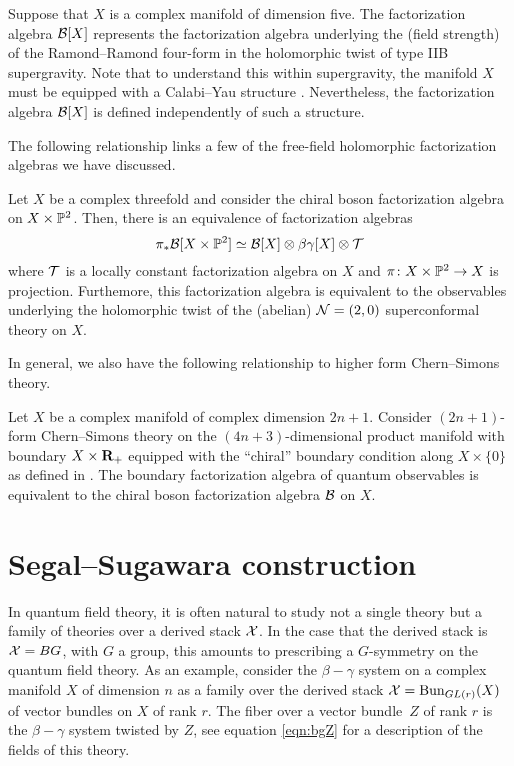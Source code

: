 \documentclass[11pt]{amsart}
\renewcommand{\op}{\operatorname}
\begin{document}
Suppose that $X$ is a complex manifold of dimension five.
The factorization algebra $\mathcal B[X]$ represents the factorization algebra underlying the (field strength) of the Ramond--Ramond four-form in the holomorphic twist of type IIB supergravity.
Note that to understand this within supergravity, the manifold $X$ must be equipped with a Calabi--Yau structure \cite{CLsugra}.
Nevertheless, the factorization algebra $\mathcal B[X]$ is defined independently of such a structure.

The following relationship links a few of the free-field holomorphic factorization algebras we have discussed.

\begin{prop}
  Let $X$ be a complex threefold and consider the chiral boson factorization algebra on $X \times \mathbb P^{2}$.
  Then, there is an equivalence of factorization algebras
  \begin{equation}\label{eqn:20}
    \pi_{*} \mathcal B[X \times \mathbb P^{2}] \simeq \mathcal B[X] \otimes \beta\gamma[X] \otimes \mathcal T
  \end{equation}
  where $\mathcal T$ is a locally constant factorization algebra on $X$ and $\pi \colon X \times \mathbb P^{2}\to X$ is projection.
  Furthemore, this factorization algebra is equivalent to the observables underlying the holomorphic twist of the (abelian) $\mathcal N=(2,0)$ superconformal theory on $X$.
\end{prop}

In general, we also have the following relationship to higher form Chern--Simons theory.

\begin{prop}
Let $X$ be a complex manifold of complex dimension $2n+1$. Consider $(2n+1)$-form Chern--Simons theory on the $(4n+3)$-dimensional product manifold with boundary $X \times \mathbf{R}_+$ equipped with the ``chiral'' boundary condition along $X \times \{0\}$ as defined in \cite{GRWcs}.
The boundary factorization algebra of quantum observables is equivalent to the chiral boson factorization algebra $\mathcal B$ on $X$.
\end{prop}

\section{Segal--Sugawara construction}

In quantum field theory, it is often natural to study not a single theory but a family of theories over a derived stack $\mathcal X$.
In the case that the derived stack is $\mathcal X = BG$, with $G$ a group, this amounts to prescribing a $G$-symmetry on the quantum field theory.
As an example, consider the $\beta-\gamma$ system on a complex manifold $X$ of dimension $n$ as a family over the
derived stack $\cX = \op{Bun}_{GL(r)}(X)$ of vector bundles on $X$ of rank $r$.
The fiber over a vector bundle~$Z$ of rank $r$ is the $\beta-\gamma$ system twisted by $Z$, see equation \eqref{eqn:bgZ} for a description of the fields of this theory.
\end{document}
